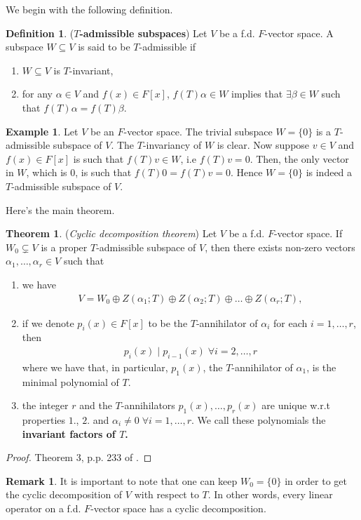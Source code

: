 \documentclass[letterpaper,11pt,twoside]{article}
\theoremstyle{definition}
\theoremstyle{definition}
\newtheorem{definition}[proposition]{Definition}
\newtheorem{theorem}[proposition]{Theorem}
\theoremstyle{definition}
\newtheorem{remark}[proposition]{\textbf{Remark}}
\theoremstyle{definition}
\theoremstyle{definition}
\theoremstyle{definition}
\newtheorem*{example}{\textbf{Example}}
\theoremstyle{remark}
\theoremstyle{definition}
\begin{document}
    We begin with the following definition.
    \begin{definition}
    	(\textbf{$ T $-admissible subspaces}) Let $ V $ be a f.d. $ F $-vector space. A subspace $ W\subseteq V $ is said to be $ T $-admissible if
    	\begin{enumerate}
    		\item {$ W \subseteq V$ is $ T $-invariant,}
    		\item {for any $ \alpha \in V $ and $ f(x)\in F[x] $, $ f(T)\alpha \in W $ implies that $ \exists \beta \in W $ such that $ f(T)\alpha = f(T)\beta $.}
    	\end{enumerate}
    \end{definition}
\begin{example}
	Let $ V $ be an $ F $-vector space. The trivial subspace $ W = \{0\} $ is a $ T $-admissible subspace of $ V $. The $ T $-invariancy of $ W $ is clear. Now suppose $ v\in V $ and $ f(x)\in F[x] $ is such that $ f(T)v \in W $, i.e $ f(T)v = 0 $. Then, the only vector in $ W $, which is 0, is such that $ f(T)0 = f(T)v = 0 $. Hence $ W=\{0\} $ is indeed a $ T $-admissible subspace of $ V $.
\end{example}
	Here's the main theorem.
\begin{theorem}\label{T-3.2.2}
	(\textit{Cyclic decomposition theorem}) Let $ V $ be a f.d. $ F $-vector space. If $ W_0 \subsetneq V $ is a proper $ T $-admissible subspace of $ V $, then there exists non-zero vectors $ \alpha_1,\dots,\alpha_r  \in V$ such that 
	\begin{enumerate}
		\item {we have
	\begin{align*}
		V  = W_{0} \oplus Z(\alpha_1;T)\oplus Z(\alpha_2;T)\oplus \dots \oplus Z(\alpha_r;T),
	\end{align*}	
	}
		\item {if we denote $ p_i(x)\in F[x] $ to be the $ T $-annihilator of $ \alpha_i $ for each $ i=1,\dots,r $, then
			\begin{align*}
				p_i(x) \;|\; p_{i-1}(x)\;\forall i=2,\dots, r
			\end{align*}
		where we have that, in particular, $ p_1(x) $, the $ T $-annihilator of $ \alpha_{1} $, is the minimal polynomial of $ T $.
	}
	\item {the integer $ r $ and the $ T $-annihilators $ p_1(x),\dots,p_r(x) $ are unique w.r.t properties $ 1. $, $ 2. $ and $ \alpha_i\neq 0 \;\forall i=1,\dots, r$. We call these polynomials the \textbf{invariant factors of $ T $.}}
	\end{enumerate}
\end{theorem}
    \begin{proof}
    	Theorem 3, p.p. 233 of \cite{HK71}.
    \end{proof}
    \begin{remark}
    	It is important to note that one can keep $ W_0 = \{0\} $ in order to get the cyclic decomposition of $ V $ with respect to $ T $. In other words, every linear operator on a f.d. $ F $-vector space has a cyclic decomposition.
    \end{remark}
\end{document}
